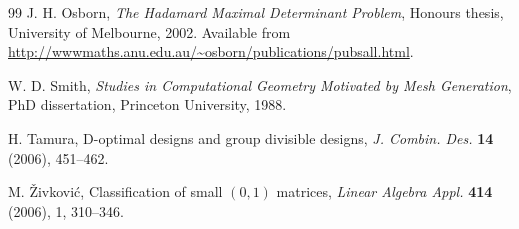 \documentclass[11pt,a4paper]{article}
\begin{document}
\begin{thebibliography}{99}
J. H. Osborn,		%
\emph{The Hadamard Maximal Determinant Problem},
{Honours thesis}, University of Melbourne, 2002.
Available from
\url{http://wwwmaths.anu.edu.au/~osborn/publications/pubsall.html}.

W. D. Smith,	 	%
\emph{Studies in Computational Geometry Motivated by Mesh Generation},
{PhD dissertation}, Princeton University, 1988.

H. Tamura,    %
D-optimal designs and group divisible designs, \emph{J. Combin. Des.} \textbf{14} (2006), 451--462.


M. \v{Z}ivkovi\'{c}, 	%
Classification of small $(0,1)$ matrices, 
\emph{Linear Algebra Appl.} \textbf{414} (2006), 1, 310--346. 

\end{thebibliography}
\end{document}
